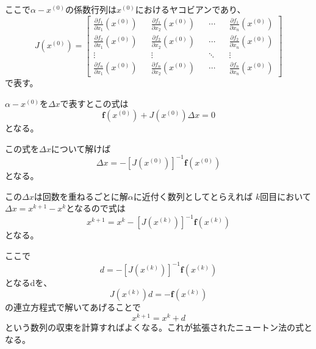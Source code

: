 \documentclass[a4paper,11pt]{jsarticle}
\begin{document}
ここで$\alpha - x^{(0)}$の係数行列は$x^{(0)}$におけるヤコビアンであり、
\begin{equation*}
    J(x^{(0)}) =
    \begin{bmatrix}
        \frac{\partial f_1}{\partial x_1}(x^{(0)}) &  & \frac{\partial f_1}{\partial x_2}(x^{(0)}) &  & \cdots &  & \frac{\partial f_1}{\partial x_n}(x^{(0)}) \\
        \frac{\partial f_2}{\partial x_1}(x^{(0)}) &  & \frac{\partial f_2}{\partial x_2}(x^{(0)}) &  & \cdots &  & \frac{\partial f_2}{\partial x_n}(x^{(0)}) \\
        \vdots                                     &  & \vdots                                     &  & \ddots &  & \vdots                                     \\
        \frac{\partial f_n}{\partial x_1}(x^{(0)}) &  & \frac{\partial f_n}{\partial x_2}(x^{(0)}) &  & \cdots &  & \frac{\partial f_n}{\partial x_n}(x^{(0)})
    \end{bmatrix}
\end{equation*}
で表す。

$\alpha - x^{(0)}$を$\Delta x$で表すとこの式は
\begin{equation*}
    \textbf{f}(x^{(0)}) + J(x^{(0)}) \Delta x = 0
\end{equation*}
となる。

この式を$\Delta x$について解けば
\begin{equation*}
    \Delta x = -[J(x^{(0)})]^{-1} \textbf{f}(x^{(0)})
\end{equation*}
となる。

この$\Delta x$は回数を重ねるごとに解$\alpha$に近付く数列としてとらえれば
$k$回目において$\Delta x = x^{k+1} - x^k$となるので式は
\begin{equation*}
    x^{k+1} = x^k -[J(x^{(k)})]^{-1} \textbf{f}(x^{(k)})
\end{equation*}
となる。

ここで
\begin{equation*}
    d = -[J(x^{(k)})]^{-1} \textbf{f}(x^{(k)})
\end{equation*}
となるdを、
\begin{equation*}
    J(x^{(k)})d = -\textbf{f}(x^{(k)})
\end{equation*}
の連立方程式で解いてあげることで
\begin{equation*}
    x^{k+1} = x^k + d
\end{equation*}
という数列の収束を計算すればよくなる。これが拡張されたニュートン法の式となる。
\end{document}
